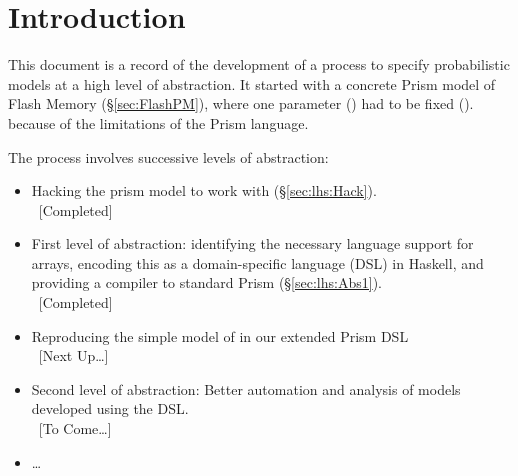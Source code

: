 \section{Introduction}\label{sec:intro}

This document is a record of the development of a process
to specify probabilistic models at a high level of abstraction.
It started with a concrete Prism model of Flash Memory (\S\ref{sec:FlashPM}),
where one parameter ()
had to be fixed ().
because of the limitations of the Prism language.

The process involves successive levels of abstraction:
\begin{itemize}
  \item
    Hacking the prism model to work with 
    (\S\ref{sec:lhs:Hack}).
    \\~[Completed]
  \item
    First level of abstraction:
    identifying the necessary language support for arrays,
    encoding this as a domain-specific language (DSL)
    in Haskell, and providing a compiler to standard Prism
    (\S\ref{sec:lhs:Abs1}).
    \\~[Completed]
  \item
    Reproducing the simple model of \cite{ProbFlash:Andrews-etal:2010}
    in our extended Prism DSL
    \\~[Next Up\dots]
  \item
    Second level of abstraction:
    Better automation and analysis of models developed using the DSL.
    \\~[To Come\dots]
  \item
    \dots
\end{itemize}
